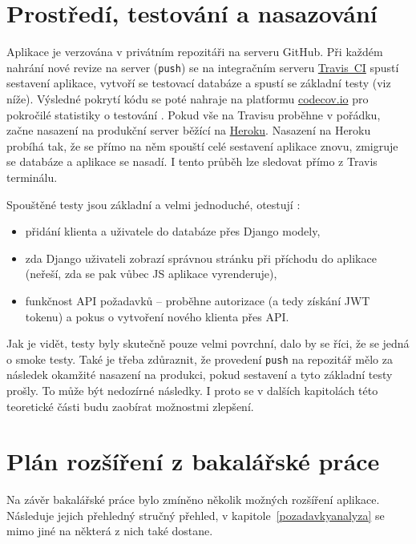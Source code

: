 \section{Prostředí, testování a nasazování}

Aplikace \cite{bp} je verzována v privátním repozitáři na serveru GitHub. Při každém nahrání nové revize na server (\verb|push|) se na integračním serveru \href{https://travis-ci.com/}{Travis~CI} spustí sestavení aplikace, vytvoří se testovací databáze a spustí se základní testy (viz níže). Výsledné pokrytí kódu se poté nahraje na platformu \href{https://codecov.io/}{codecov.io} pro pokročilé statistiky o testování \cite{codecov}. Pokud vše na Travisu proběhne v pořádku, začne nasazení na produkční server běžící na \href{https://www.heroku.com/}{Heroku}. Nasazení na Heroku probíhá tak, že se přímo na něm spouští celé sestavení aplikace znovu, zmigruje se databáze a aplikace se nasadí. I tento průběh lze sledovat přímo z Travis terminálu.

Spouštěné testy jsou základní a velmi jednoduché, otestují \cite{bp}:
\begin{itemize}
    \item přidání klienta a uživatele do databáze přes Django modely,
    \item zda Django uživateli zobrazí správnou stránku při příchodu do aplikace (neřeší, zda se pak vůbec JS aplikace vyrenderuje),
    \item funkčnost API požadavků -- proběhne autorizace (a tedy získání JWT tokenu) a pokus o vytvoření nového klienta přes API.
\end{itemize}

Jak je vidět, testy byly skutečně pouze velmi povrchní, dalo by se říci, že se jedná o smoke testy. Také je třeba zdůraznit, že provedení \verb|push| na repozitář mělo za následek okamžité nasazení na produkci, pokud sestavení a tyto základní testy prošly. To může být nedozírné následky. I proto se v dalších kapitolách této teoretické části budu zaobírat možnostmi zlepšení.

\section{Plán rozšíření z bakalářské práce}

Na závěr bakalářské práce \cite{bp} bylo zmíněno několik možných rozšíření aplikace. Následuje jejich přehledný stručný přehled, v kapitole~\ref{pozadavkyanalyza} se mimo jiné na některá z nich také dostane.

